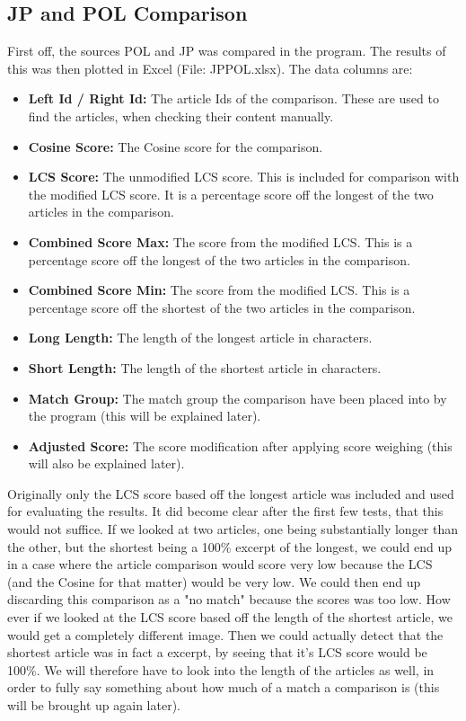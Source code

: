 \subsection{JP and POL Comparison}
First off, the sources POL and JP was compared in the program. The results of this was then plotted in Excel (File: JPPOL.xlsx). The data columns are:

\begin{itemize}
\item \textbf{Left Id / Right Id:} The article Ids of the comparison. These are used to find the articles, when checking their content manually.
\item \textbf{Cosine Score:} The Cosine score for the comparison.
\item \textbf{LCS Score:} The unmodified LCS score. This is included for comparison with the modified LCS score. It is a percentage score off the longest of the two articles in the comparison.
\item \textbf{Combined Score Max:} The score from the modified LCS. This is a percentage score off the longest of the two articles in the comparison.
\item \textbf{Combined Score Min:} The score from the modified LCS. This is a percentage score off the shortest of the two articles in the comparison.
\item \textbf{Long Length:} The length of the longest article in characters.
\item \textbf{Short Length:} The length of the shortest article in characters.
\item \textbf{Match Group:} The match group the comparison have been placed into by the program (this will be explained later).
\item \textbf{Adjusted Score:} The score modification after applying score weighing (this will also be explained later).
\end{itemize}

Originally only the LCS score based off the longest article was included and used for evaluating the results. It did become clear after the first few tests, that this would not suffice. If we looked at two articles, one being substantially longer than the other, but the shortest being a 100\% excerpt of the longest, we could end up in a case where the article comparison would score very low because the LCS (and the Cosine for that matter) would be very low. We could then end up discarding this comparison as a "no match" because the scores was too low. How ever if we looked at the LCS score based off the length of the shortest article, we would get a completely different image. Then we could actually detect that the shortest article was in fact a excerpt, by seeing that it's LCS score would be 100\%. We will therefore have to look into the length of the articles as well, in order to fully say something about how much of a match a comparison is (this will be brought up again later).

